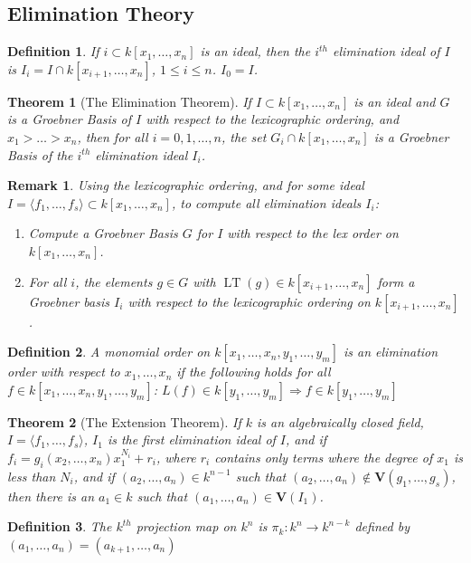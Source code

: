 \documentclass[oneside]{book}
\theoremstyle{mystyle}
\newtheorem{theorem}{Theorem}[section]
\newtheorem{definition}{Definition}[section]
\newtheorem{remark}{Remark}[section]
\DeclareMathOperator{\LT}{LT}
\begin{document}
\subsection{Elimination Theory}
\begin{definition}
If $i\subset k[x_1,\hdots ,x_n]$ is an ideal, then the $i^{th}$ elimination ideal of $I$ is $I_{i} = I\cap k[x_{i+1},\hdots, x_n]$, $1\leq i \leq n$. $I_{0} = I$.
\end{definition}
\begin{theorem}[The Elimination Theorem]
If $I\subset k[x_1,\hdots ,x_n]$ is an ideal and $G$ is a Groebner Basis of $I$ with respect to the lexicographic ordering, and $x_1>\hdots > x_n$, then for all $i=0,1,\hdots, n$, the set $G_i \cap k[x_1,\hdots ,x_n]$ is a Groebner Basis of the $i^{th}$ elimination ideal $I_{i}$.
\end{theorem}
\begin{remark}
Using the lexicographic ordering, and for some ideal $I = \langle f_1,\hdots, f_s\rangle \subset k[x_1,\hdots ,x_n]$, to compute all elimination ideals $I_{i}$:
\begin{enumerate}
    \item Compute a Groebner Basis $G$ for $I$ with respect to the lex order on $k[x_1,\hdots ,x_n]$.
    \item For all $i$, the elements $g\in G$ with $\LT(g)\in k[x_{i+1},\hdots, x_n]$ form a Groebner basis $I_{i}$ with respect to the lexicographic ordering on $k[x_{i+1},\hdots, x_n]$.
\end{enumerate}
\end{remark}
\begin{definition}
A monomial order on $k[x_1,\hdots, x_n,y_1,\hdots, y_m]$ is an elimination order with respect to $x_1,\hdots, x_n$ if the following holds for all $f\in k[x_1,\hdots, x_n, y_1, \hdots, y_m]$: $L(f) \in k[y_1,\hdots, y_m] \Rightarrow f\in k[y_1,\hdots, y_m]$
\end{definition}
\begin{theorem}[The Extension Theorem]
If $k$ is an algebraically closed field, $I = \langle f_1,\hdots, f_s\rangle$, $I_{1}$ is the first elimination ideal of $I$, and if $f_i = g_i(x_2,\hdots, x_n)x_1^{N_i}+r_i$, where $r_i$ contains only terms where the degree of $x_1$ is less than $N_i$, and if $(a_2,\hdots, a_n)\in k^{n-1}$ such that $(a_2,\hdots, a_n) \notin \mathbf{V}(g_1,\hdots, g_s)$, then there is an $a_1 \in k$ such that $(a_1,\hdots, a_n) \in \mathbf{V}(I_1)$.
\end{theorem}
\begin{definition}
The $k^{th}$ projection map on $k^n$ is $\pi_{k}: k^n\rightarrow k^{n-k}$ defined by $(a_1,\hdots, a_n) = (a_{k+1},\hdots, a_n)$
\end{definition}
\end{document}
